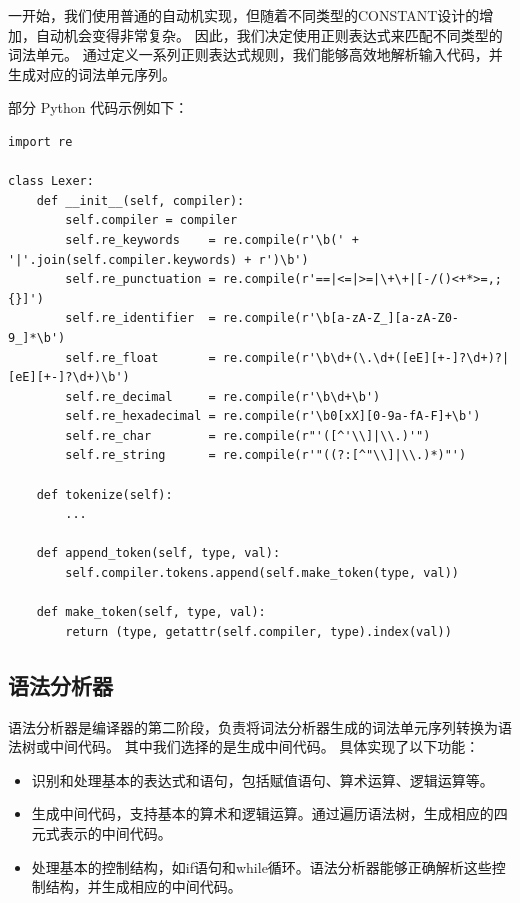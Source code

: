 \documentclass[12pt]{article}
\begin{document}
一开始，我们使用普通的自动机实现，但随着不同类型的CONSTANT设计的增加，自动机会变得非常复杂。
因此，我们决定使用正则表达式来匹配不同类型的词法单元。
通过定义一系列正则表达式规则，我们能够高效地解析输入代码，并生成对应的词法单元序列。

部分 Python 代码示例如下：
\begin{lstlisting}
import re

class Lexer:
    def __init__(self, compiler):
        self.compiler = compiler
        self.re_keywords    = re.compile(r'\b(' + '|'.join(self.compiler.keywords) + r')\b')
        self.re_punctuation = re.compile(r'==|<=|>=|\+\+|[-/()<+*>=,;{}]')
        self.re_identifier  = re.compile(r'\b[a-zA-Z_][a-zA-Z0-9_]*\b')
        self.re_float       = re.compile(r'\b\d+(\.\d+([eE][+-]?\d+)?|[eE][+-]?\d+)\b')
        self.re_decimal     = re.compile(r'\b\d+\b')
        self.re_hexadecimal = re.compile(r'\b0[xX][0-9a-fA-F]+\b')
        self.re_char        = re.compile(r"'([^'\\]|\\.)'")
        self.re_string      = re.compile(r'"((?:[^"\\]|\\.)*)"')
    
    def tokenize(self):
        ...
    
    def append_token(self, type, val):
        self.compiler.tokens.append(self.make_token(type, val))
    
    def make_token(self, type, val):
        return (type, getattr(self.compiler, type).index(val))
\end{lstlisting}

\subsection{语法分析器}
\quad\quad 
语法分析器是编译器的第二阶段，负责将词法分析器生成的词法单元序列转换为语法树或中间代码。
其中我们选择的是生成中间代码。
具体实现了以下功能：

\begin{itemize}
    \item 识别和处理基本的表达式和语句，包括赋值语句、算术运算、逻辑运算等。
    \item 生成中间代码，支持基本的算术和逻辑运算。通过遍历语法树，生成相应的四元式表示的中间代码。
    \item 处理基本的控制结构，如if语句和while循环。语法分析器能够正确解析这些控制结构，并生成相应的中间代码。
\end{itemize}
\end{document}
